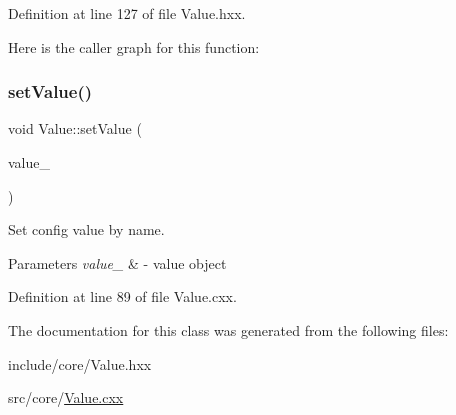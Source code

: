 Definition at line 127 of file Value.\+hxx.

Here is the caller graph for this function\+:
\mbox{\label{classeven_1_1_value_af538617a3d65889d8de19a5854934d35}} 
\subsubsection{\texorpdfstring{set\+Value()}{setValue()}}
{\footnotesize\ttfamily void Value\+::set\+Value (\begin{DoxyParamCaption}\item[{const Q\+Variant \&}]{value\+\_\+ }\end{DoxyParamCaption})}



Set config value by name. 


\begin{DoxyParams}{Parameters}
{\em value\+\_\+} & -\/ value object \\
\hline
\end{DoxyParams}


Definition at line 89 of file Value.\+cxx.



The documentation for this class was generated from the following files\+:\begin{DoxyCompactItemize}
\item 
include/core/Value.\+hxx\item 
src/core/\mbox{\hyperlink{_value_8cxx}{Value.\+cxx}}\end{DoxyCompactItemize}
